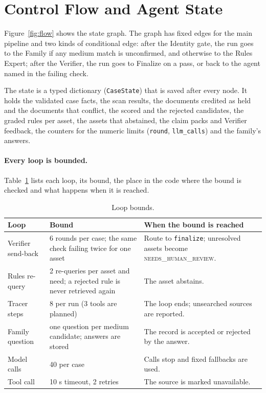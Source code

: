 \documentclass[12pt,a4paper,oneside]{report}
\begin{document}
\section{Control Flow and Agent State}
Figure~\ref{fig:flow} shows the state graph. The graph has fixed edges for the main pipeline and two kinds of conditional edge: after the Identity gate, the run goes to the Family if any medium match is unconfirmed, and otherwise to the Rules Expert; after the Verifier, the run goes to Finalize on a pass, or back to the agent named in the failing check.



The state is a typed dictionary (\texttt{CaseState}) that is saved after every node. It holds the validated case facts, the scan results, the documents credited as held and the documents that conflict, the scored and the rejected candidates, the graded rules per asset, the assets that abstained, the claim packs and Verifier feedback, the counters for the numeric limits (\texttt{round}, \texttt{llm\_calls}) and the family's answers.

\paragraph{Every loop is bounded.} Table~\ref{tab:loops} lists each loop, its bound, the place in the code where the bound is checked and what happens when it is reached.

\begin{table}[H]
\centering\footnotesize{}
\caption{Loop bounds.}\label{tab:loops}
\renewcommand{\arraystretch}{1.1}
\begin{tabularx}{\linewidth}{@{}p{3.2cm}p{2.8cm}X@{}}
\toprule
\textbf{Loop} & \textbf{Bound} & \textbf{When the bound is reached} \\ \midrule
Verifier send-back & 6 rounds per case; the same check failing twice for one asset & Route to \texttt{finalize}; unresolved assets become \textsc{needs\_human\_review}. \\
Rules re-query & 2 re-queries per asset and need; a rejected rule is never retrieved again & The asset abstains. \\
Tracer steps & 8 per run (3 tools are planned) & The loop ends; unsearched sources are reported. \\
Family question & one question per medium candidate; answers are stored & The record is accepted or rejected by the answer. \\
Model calls & 40 per case & Calls stop and fixed fallbacks are used. \\
Tool call & 10 s timeout, 2 retries & The source is marked unavailable. \\ \bottomrule
\end{tabularx}
\end{table}
\end{document}
